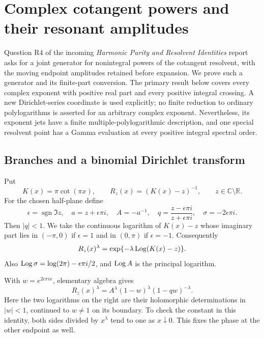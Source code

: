 \section{Complex cotangent powers and their resonant amplitudes}
\label{bhr:cxp:sec:complex}

Question R4 of the incoming \emph{Harmonic Parity and Resolvent
Identities} report \cite{bhr:Parity} asks for a joint generator for nonintegral powers of
the cotangent resolvent, with the moving endpoint amplitudes retained
before expansion.  We prove such a generator and its finite-part
conversion.  The primary result below covers every complex exponent
with positive real part and every positive integral crossing.  A new
Dirichlet-series coordinate is used explicitly; no finite reduction to
ordinary polylogarithms is asserted for an arbitrary complex exponent.
Nevertheless, its exponent jets have a finite multiple-polylogarithmic
description, and one special resolvent point has a Gamma evaluation at
every positive integral spectral order.

\subsection{Branches and a binomial Dirichlet transform}

Put
\[
 K(x)=\pi\cot(\pi x),\qquad R_z(x)=(K(x)-z)^{-1},
 \qquad z\in\mathbb C\setminus\mathbb R.
\]
For the chosen half-plane define
\[
 \epsilon=\operatorname{sgn}\Im z,\quad
 a=z+\epsilon\pi i,\quad A=-a^{-1},\quad
 q=\frac{z-\epsilon\pi i}{z+\epsilon\pi i},\quad
 \sigma=-2\epsilon\pi i.
\]
Then \(|q|<1\).  We take the continuous logarithm of \(K(x)-z\)
whose imaginary part lies in \((-\pi,0)\) if \(\epsilon=1\) and
in \((0,\pi)\) if \(\epsilon=-1\).  Consequently
\[
 R_z(x)^\lambda=\exp\{-\lambda\operatorname{Log}(K(x)-z)\}.
\]
Also \(\operatorname{Log}\sigma=\log(2\pi)-\epsilon\pi i/2\), and
\(\operatorname{Log} A\) is the principal logarithm.

With \(w=e^{2\epsilon\pi i x}\), elementary algebra gives
\begin{equation}\label{bhr:cxp:eq:disk}
 R_z(x)^\lambda
 =A^\lambda(1-w)^\lambda(1-qw)^{-\lambda}.
\end{equation}
Here the two logarithms on the right are their holomorphic
determinations in \(|w|<1\), continued to \(w\ne1\) on its boundary.
To check the constant in this identity, both sides divided by
\(x^\lambda\) tend to one as \(x\downarrow0\).  This fixes the phase
at the other endpoint as well.

